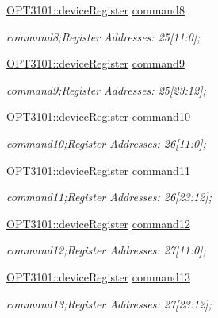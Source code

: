 \begin{DoxyCompactItemize}
\mbox{\hyperlink{class_o_p_t3101_1_1device_register}{O\+P\+T3101\+::device\+Register}} \mbox{\hyperlink{class_o_p_t3101_1_1registers_ace1ee1c323057d120e63bdc578a077c5}{command8}}
\begin{DoxyCompactList}\small\item\em command8;Register Addresses\+: 25\mbox{[}11\+:0\mbox{]}; \end{DoxyCompactList}\item 
\mbox{\hyperlink{class_o_p_t3101_1_1device_register}{O\+P\+T3101\+::device\+Register}} \mbox{\hyperlink{class_o_p_t3101_1_1registers_a5b64854b22e45043f666d9c7857b2b56}{command9}}
\begin{DoxyCompactList}\small\item\em command9;Register Addresses\+: 25\mbox{[}23\+:12\mbox{]}; \end{DoxyCompactList}\item 
\mbox{\hyperlink{class_o_p_t3101_1_1device_register}{O\+P\+T3101\+::device\+Register}} \mbox{\hyperlink{class_o_p_t3101_1_1registers_a9bfb55fd85ac862b110a12f2f23eb699}{command10}}
\begin{DoxyCompactList}\small\item\em command10;Register Addresses\+: 26\mbox{[}11\+:0\mbox{]}; \end{DoxyCompactList}\item 
\mbox{\hyperlink{class_o_p_t3101_1_1device_register}{O\+P\+T3101\+::device\+Register}} \mbox{\hyperlink{class_o_p_t3101_1_1registers_a680960aa51d5071409841500cf79fac7}{command11}}
\begin{DoxyCompactList}\small\item\em command11;Register Addresses\+: 26\mbox{[}23\+:12\mbox{]}; \end{DoxyCompactList}\item 
\mbox{\hyperlink{class_o_p_t3101_1_1device_register}{O\+P\+T3101\+::device\+Register}} \mbox{\hyperlink{class_o_p_t3101_1_1registers_a263ffae0bb0286bbacaa5000628f41df}{command12}}
\begin{DoxyCompactList}\small\item\em command12;Register Addresses\+: 27\mbox{[}11\+:0\mbox{]}; \end{DoxyCompactList}\item 
\mbox{\hyperlink{class_o_p_t3101_1_1device_register}{O\+P\+T3101\+::device\+Register}} \mbox{\hyperlink{class_o_p_t3101_1_1registers_a074ece9b8b246318b5f57448d29c1474}{command13}}
\begin{DoxyCompactList}\small\item\em command13;Register Addresses\+: 27\mbox{[}23\+:12\mbox{]}; \end{DoxyCompactList}\item 

\end{DoxyCompactItemize}
